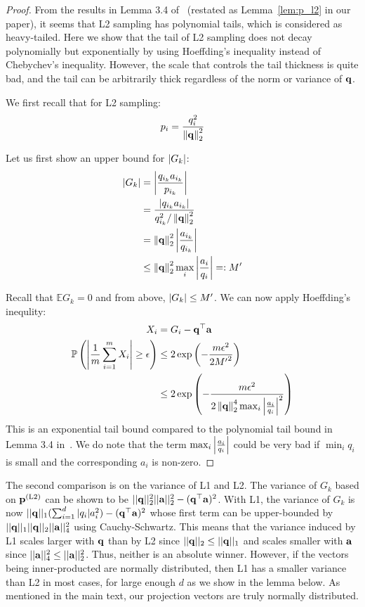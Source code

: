 \begin{proof}
From the results in Lemma 3.4 of~\cite{jain10hashing} (restated as Lemma~\ref{lem:p_l2} in our paper), it seems that L2 sampling has polynomial tails, which is considered as heavy-tailed.
Here we show that the tail of L2 sampling does not decay polynomially but exponentially by using Hoeffding's inequality instead of Chebychev's inequality.
However, the scale that controls the tail thickness is quite bad, and the tail can be arbitrarily thick regardless of the norm or variance of ${{\mathbf q}}$.

We first recall that for L2 sampling:
$$ p_i = \frac{q_i^2}{\left\Vert \mathbf{q} \right\Vert_2^2} $$

Let us first show an upper bound for $\left\vert G_k \right\vert$:
\begin{align*}
\left\vert G_k \right\vert &= \left\vert \frac{q_{i_k} a_{i_k}}{p_{i_k}} \right\vert \\
&= \frac{ \left\vert q_{i_k} a_{i_k} \right\vert}{ q_{i_k}^2/ \left\Vert \mathbf{q} \right\Vert_2^2 } \\
&= \left\Vert \mathbf{q} \right\Vert_2^2 \left\vert \frac{a_{i_k}}{q_{i_k}} \right\vert \\
&\leq \left\Vert \mathbf{q} \right\Vert_2^2 \max_i \left\vert \frac{a_{i}}{q_{i}} \right\vert =: M' \\
\end{align*}

Recall that $\mathbb{E} G_k = 0$ and from above, $\left\vert G_k \right\vert \leq M'$. We can now apply Hoeffding's inequlity:
\begin{align*}
X_i &= G_i - \vq^\top \va \\
\Pr \left( \lv \frac{1}{m} \sum_{i=1}^m  X_i \rv \geq \epsilon \right) %
&\leq 2 \exp \left(- \frac{ m \epsilon^2}{2 {M'}^2} \right) \\
&\leq 2 \exp \left(- \frac{ m \epsilon^2}{2 \lV \vq \rV_2^4 \max_i \lv\frac{a_{i}}{q_{i}} \rv^2 } \right) \\
\end{align*}
This is an exponential tail bound compared to the polynomial tail bound in Lemma 3.4 in~\cite{jain10hashing}. We do note that the term $\max_i \left\vert\frac{a_{i}}{q_{i}} \right\vert$ could be very bad if $\min_i q_i$ is small and the corresponding $a_i$ is non-zero.
\end{proof}  
%

The second comparison is on the variance of L1 and L2.
The variance of $G_k$ based on ${{\mathbf p}}^{(\mathbf{\text{L}}2)}$ can be shown to be  $||{{\mathbf q}}||_2^2||\mathbf{a}||_2^2 - ({{\mathbf q}}^{\top} \mathbf{a})^2$.
With L1, the variance of $G_k$ is now $||{{\mathbf q}}||_1 (\sum_{i=1}^d |q_i| a_i^2) - ({{\mathbf q}}^{\top} \mathbf{a})^2$ whose first term can be upper-bounded by $||{{\mathbf q}}||_1 ||{{\mathbf q}}||_2 ||\mathbf{a}||_4^2 $ using Cauchy-Schwartz.
This means that the variance induced by L1 scales larger with ${{\mathbf q}}$ than by L2 since $||{{\mathbf q}}||_2 \le ||{{\mathbf q}}||_1$ and scales smaller with $\mathbf{a}$ since $||\mathbf{a}||_4^2 \le ||\mathbf{a}||_2^2$. 
Thus, neither is an absolute winner.
However, if the vectors being inner-producted are normally distributed, then L1 has a smaller variance than L2 in most cases, for large enough $d$ as we show in the lemma below.
As mentioned in the main text, our projection vectors are truly normally distributed.

